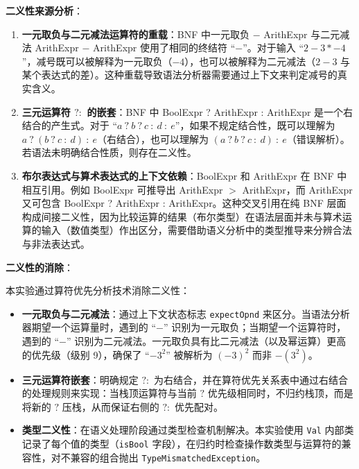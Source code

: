 \textbf{二义性来源分析}：

\begin{enumerate}
    \item \textbf{一元取负与二元减法运算符的重载}：BNF 中一元取负 $-$ ArithExpr 与二元减法 ArithExpr $-$ ArithExpr 使用了相同的终结符 ``$-$''。对于输入 ``$2 - 3 * -4$''，减号既可以被解释为一元取负（$-4$），也可以被解释为二元减法（$2 - 3$ 与某个表达式的差）。这种重载导致语法分析器需要通过上下文来判定减号的真实含义。

    \item \textbf{三元运算符 $?:$ 的嵌套}：BNF 中 BoolExpr ? ArithExpr : ArithExpr 是一个右结合的产生式。对于 ``$a\ ?\ b\ ?\ c\ :\ d\ :\ e$''，如果不规定结合性，既可以理解为 $a\ ?\ (b\ ?\ c\ :\ d)\ :\ e$（右结合），也可以理解为 $(a\ ?\ b\ ?\ c\ :\ d)\ :\ e$（错误解析）。若语法未明确结合性质，则存在二义性。

    \item \textbf{布尔表达式与算术表达式的上下文依赖}：BoolExpr 和 ArithExpr 在 BNF 中相互引用。例如 BoolExpr 可推导出 ArithExpr $>$ ArithExpr，而 ArithExpr 又可包含 BoolExpr ? ArithExpr : ArithExpr。这种交叉引用在纯 BNF 层面构成间接二义性，因为比较运算的结果（布尔类型）在语法层面并未与算术运算的输入（数值类型）作出区分，需要借助语义分析中的类型推导来分辨合法与非法表达式。
\end{enumerate}

\textbf{二义性的消除}：

本实验通过算符优先分析技术消除二义性：
\begin{itemize}
    \item \textbf{一元取负与二元减法}：通过上下文状态标志 \texttt{expectOpnd} 来区分。当语法分析器期望一个运算量时，遇到的 ``$-$'' 识别为一元取负；当期望一个运算符时，遇到的 ``$-$'' 识别为二元减法。一元取负具有比二元减法（以及幂运算）更高的优先级（级别 9），确保了 ``$-3^2$'' 被解析为 $(-3)^2$ 而非 $-(3^2)$。

    \item \textbf{三元运算符嵌套}：明确规定 $?:$ 为右结合，并在算符优先关系表中通过右结合的处理规则来实现：当栈顶运算符与当前 $?$ 优先级相同时，不归约栈顶，而是将新的 $?$ 压栈，从而保证右侧的 $?:$ 优先配对。

    \item \textbf{类型二义性}：在语义处理阶段通过类型检查机制解决。本实验使用 \texttt{Val} 内部类记录了每个值的类型（\texttt{isBool} 字段），在归约时检查操作数类型与运算符的兼容性，对不兼容的组合抛出 \texttt{TypeMismatchedException}。
\end{itemize}

